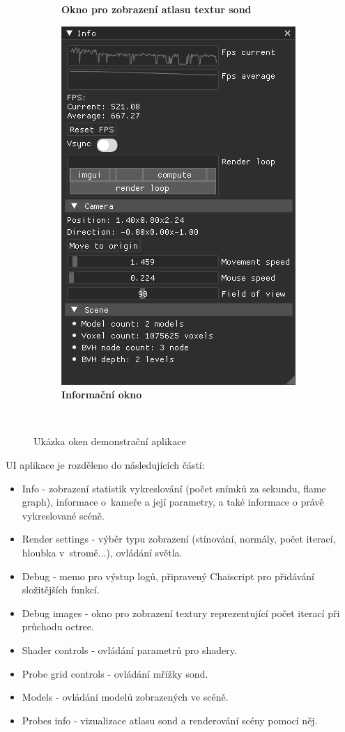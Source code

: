 \begin{figure}[H]
\begin{subfigure}[t]{.49\textwidth}
		\caption{\textbf{Okno pro zobrazení atlasu textur sond}}
		\label{fig:probe_ui}
	\end{subfigure}
		\begin{subfigure}[t]{1\textwidth}
			\centering
        	\includegraphics[scale=1]{images/dp_ui_info.png}
        	\caption{\textbf{Informační okno}}
        	\label{fig:info_ui}
	\end{subfigure}\\
	\caption{Ukázka oken demonstrační aplikace}
	\label{fig:UI}
\end{figure}


UI aplikace je rozděleno do následujících částí:

\begin{itemize}
	\item Info - zobrazení statistik vykreslování (počet snímků za sekundu, flame graph), informace o~kameře a její parametry, a také informace o právě vykreslované scéně.
	\item Render settings - výběr typu zobrazení (stínování, normály, počet iterací, hloubka v~stromě...), ovládání světla.
	\item Debug - memo pro výstup logů, připravený Chaiscript pro přidávání složitějších funkcí.
	\item Debug images - okno pro zobrazení textury reprezentující počet iterací při průchodu octree.
	\item Shader controls - ovládání parametrů pro shadery.
	\item Probe grid controls - ovládání mřížky sond.
	\item Models - ovládání modelů zobrazených ve scéně.
	\item Probes info - vizualizace atlasu sond a renderování scény pomocí něj.
\end{itemize}


